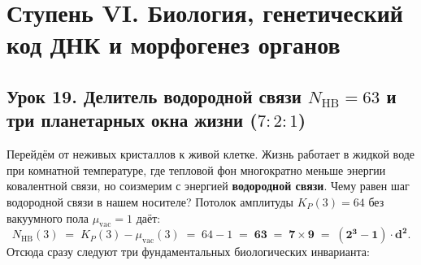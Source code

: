 \chapter{Ступень VI. Биология, генетический код ДНК и морфогенез органов}
\label{ch:course-stage6-biology}

\section{Урок 19. Делитель водородной связи \texorpdfstring{$N_{\mathrm{HB}} = 63$}{N\_HB = 63} и три планетарных окна жизни (\texorpdfstring{$7 : 2 : 1$}{7 : 2 : 1})}

Перейдём от неживых кристаллов к живой клетке. Жизнь работает в жидкой воде при комнатной температуре, где тепловой фон многократно меньше энергии ковалентной связи, но соизмерим с энергией \textbf{водородной связи}. Чему равен шаг водородной связи в нашем носителе? Потолок амплитуды $K_P(3) = 64$ без вакуумного пола $\mu_{\mathrm{vac}} = 1$ даёт:
\[
  N_{\mathrm{HB}}(3) \;=\; K_P(3) - \mu_{\mathrm{vac}}(3) \;=\; 64 - 1 \;=\; \mathbf{63 \;=\; 7 \times 9 \;=\; (2^3 - 1)\cdot d^2}.
\]
Отсюда сразу следуют три фундаментальных биологических инварианта:
